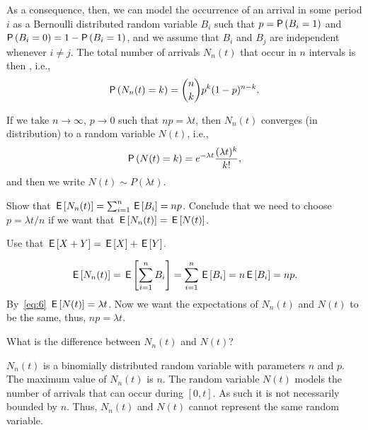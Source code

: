 As a consequence, then, we can model the occurrence of an arrival in some period $i$ as a Bernoulli distributed random variable $B_i$ such that $p=\P{B_i =1}$ and $\P{B_i=0} = 1-\P{B_i = 1}$, and we assume that $B_i$ and $B_j$ are independent whenever $i\neq j$.
The total number of arrivals $N_n(t)$ that occur in $n$ intervals is then , i.e.,
\begin{equation}\label{eq:bin}
 \P{N_n(t) = k} = {n \choose k} p^k (1-p)^{n-k}.
\end{equation}

If we take $n\to\infty$, $p\to0$ such that $n p=\lambda t$, then $N_n(t)$ converges (in distribution) to a  random variable $N(t)$, i.e., 
\begin{equation}\label{eq:pois}
 \P{N(t) = k} = 
e^{-\lambda t} \frac{(\lambda t)^k}{k!}, 
\end{equation}
and then we write $N(t)\sim P(\lambda t)$.


\begin{extra}
Show that $\,\mathsf{E}\left[N_n(t)\right] = \sum_{i=1}^n \,\mathsf{E}\left[B_i\right] = n p$. Conclude that we need to choose $p = \lambda t/n$ if we want that $\,\mathsf{E}\left[N_n(t)\right] = \,\mathsf{E}\left[N(t)\right]$.
\begin{hint}
Use that $\,\mathsf{E}\left[X+Y\right] = \,\mathsf{E}\left[X\right] + \,\mathsf{E}\left[Y\right]$. 
\end{hint}
\begin{solution}
 \begin{equation*}
 \,\mathsf{E}\left[N_n(t)\right] = \,\mathsf{E}\left[\sum_{i=1}^n {B_i}\right] = \sum_{i=1}^n \,\mathsf{E}\left[B_i\right] = n \,\mathsf{E}\left[B_i\right] = n p.
 \end{equation*}
 By~\cref{eq:6} $\,\mathsf{E}\left[N(t)\right] = \lambda t$. Now we want the expectations of $N_n(t)$ and $N(t)$ to be the same, thus, $n p = \lambda t$. 
\end{solution}
\end{extra}

\begin{extra}
What is the difference between $N_n(t)$ and $N(t)$?
\begin{solution}
 $N_n(t)$ is a binomially distributed random variable with parameters $n$ and $p$.
 The maximum value of $N_n(t)$ is $n$.
 The random variable $N(t)$ models the number of arrivals that can occur during $[0,t]$.
 As such it is not necessarily bounded by $n$.
 Thus, $N_n(t)$ and $N(t)$ cannot represent the same random variable.
\end{solution}
\end{extra}

